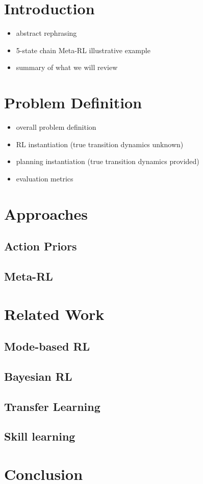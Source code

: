 \section{Introduction}
\begin{itemize}
\item abstract rephrasing
\item 5-state chain Meta-RL illustrative example
\item summary of what we will review
\end{itemize}

\section{Problem Definition}
\begin{itemize}
\item overall problem definition
\item RL instantiation (true transition dynamics unknown)
\item planning instantiation (true transition dynamics provided)
\item evaluation metrics 
\end{itemize}

\section{Approaches}
\subsection{Action Priors}
\subsection{Meta-RL}

\section{Related Work}
\subsection{Mode-based RL}
\subsection{Bayesian RL}
\subsection{Transfer Learning}
\subsection{Skill learning}


\section{Conclusion}